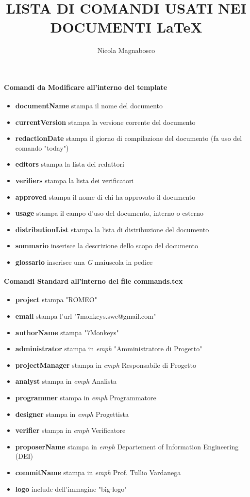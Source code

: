 \documentclass[10pt]{article}
\title{LISTA DI COMANDI USATI NEI DOCUMENTI LaTeX \version}
\author{Nicola Magnabosco}
\begin{document}
\maketitle
	\paragraph{Comandi da Modificare all'interno del \textbf{template}}
	\begin{itemize}
			\item \textbf{documentName} stampa il nome del documento
			\item \textbf{currentVersion }stampa la versione corrente del documento
			\item \textbf{redactionDate} stampa il giorno di compilazione del documento (fa uso del comando "today")
			\item \textbf{editors} stampa la lista dei redattori
			\item \textbf{verifiers} stampa la lista dei verificatori
			\item \textbf{approved} stampa il nome di chi ha approvato il documento
			\item \textbf{usage} stampa il campo d'uso del documento, interno o esterno
			\item \textbf{distributionList} stampa la lista di distribuzione del documento
			\item \textbf{sommario} inserisce la descrizione dello scopo del documento
			\item \textbf{glossario} inserisce una \textit{G} maiuscola in pedice
	\end{itemize}
	\paragraph{Comandi Standard all'interno del file commands.tex}
	\begin{itemize}
		\item \textbf{project} stampa "ROMEO"
		\item \textbf{email} stampa l'url "7monkeys.swe@gmail.com"
		\item \textbf{authorName} stampa "7Monkeys"
		\item \textbf{administrator} stampa in \textit{emph} "Amministratore di Progetto"
		\item \textbf{projectManager} stampa in \textit{emph} Responsabile di Progetto
		\item \textbf{analyst} stampa in \textit{emph} Analista
		\item \textbf{programmer} stampa in \textit{emph} Programmatore
		\item \textbf{designer} stampa in \textit{emph} Progettista
		\item \textbf{verifier} stampa in \textit{emph} Verificatore
		\item \textbf{proposerName} stampa in \textit{emph} Departement of Information Engineering (DEI)
		\item \textbf{commitName} stampa in \textit{emph} Prof. Tullio Vardanega
		\item \textbf{logo}  include dell'immagine "big-logo"
		
	\end{itemize}
\end{document}
